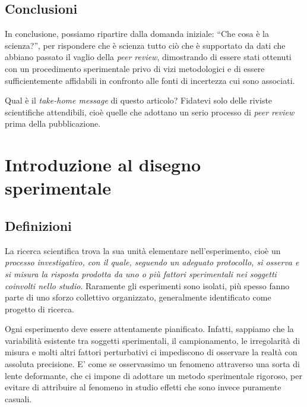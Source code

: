 \documentclass[a4paper,12pt,oneside]{book}
\begin{document}
\section{Conclusioni}\label{conclusioni}

In conclusione, possiamo ripartire dalla domanda iniziale: ``Che cosa è
la scienza?'', per rispondere che è scienza tutto ciò che è supportato
da dati che abbiano passato il vaglio della \emph{peer review},
dimostrando di essere stati ottenuti con un procedimento sperimentale
privo di vizi metodologici e di essere sufficientemente affidabili in
confronto alle fonti di incertezza cui sono associati.

Qual è il \emph{take-home message} di questo articolo? Fidatevi solo
delle riviste scientifiche attendibili, cioè quelle che adottano un
serio processo di \emph{peer review} prima della pubblicazione.

\chapter{Introduzione al disegno
sperimentale}\label{introduzione-al-disegno-sperimentale}

\section{Definizioni}\label{definizioni}

La ricerca scientifica trova la sua unità elementare nell'esperimento,
cioè un \emph{processo investigativo, con il quale, seguendo un adeguato
protocollo, si osserva e si misura la risposta prodotta da uno o più
fattori sperimentali nei soggetti coinvolti nello studio}. Raramente gli
esperimenti sono isolati, più spesso fanno parte di uno sforzo
collettivo organizzato, generalmente identificato come progetto di
ricerca.

Ogni esperimento deve essere attentamente pianificato. Infatti, sappiamo
che la variabilità esistente tra soggetti sperimentali, il
campionamento, le irregolarità di misura e molti altri fattori
perturbativi ci impediscono di osservare la realtà con assoluta
precisione. E' come se osservassimo un fenomeno attraverso una sorta di
lente deformante, che ci impone di adottare un metodo sperimentale
rigoroso, per evitare di attribuire al fenomeno in studio effetti che
sono invece puramente casuali.
\end{document}

